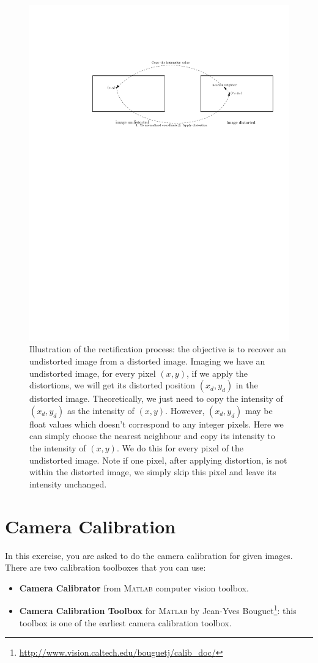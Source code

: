 \documentclass[a4paper]{article}
\begin{document}
\begin{figure}[!b]
\centering
\includegraphics[scale=0.9]{figures/ex2_und}
\caption{Illustration of the rectification process: the objective is to recover an undistorted image from a distorted image. Imaging we have an undistorted image, for every pixel $(x,y)$, if we apply the distortions, we will get its distorted position $(x_d,y_d)$ in the distorted image. Theoretically, we just need to copy the intensity of $(x_d,y_d)$ as the intensity of  $(x,y)$. However, $(x_d,y_d)$ may be float values which doesn't correspond to any integer pixels. Here we can simply choose the nearest neighbour and copy its intensity to the intensity of $(x,y)$. We do this for every pixel of the undistorted image. Note if one pixel, after applying distortion, is not within the distorted image, we simply skip this pixel and leave its intensity unchanged.}
\end{figure}
\section{Camera Calibration}
In this exercise, you are asked to do the camera calibration for given images. There are two calibration toolboxes that you can use:
\begin{itemize}
\item \textbf{Camera Calibrator} from \textsc{Matlab} computer vision toolbox.
\item \textbf{Camera Calibration Toolbox} for \textsc{Matlab} by Jean-Yves Bouguet\footnote{\url{http://www.vision.caltech.edu/bouguetj/calib_doc/}}: this toolbox is one of the earliest camera calibration toolbox.
\end{itemize}
\end{document}
